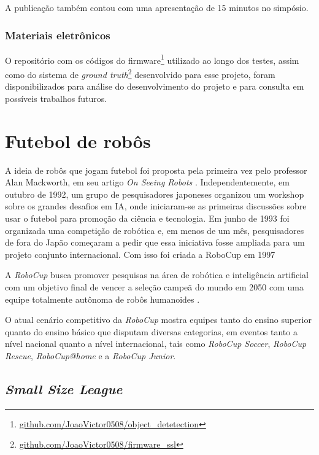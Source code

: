 \documentclass[acronym, symbols, table, deposito]{fei}
\begin{document}
			A publicação também contou com uma apresentação de 15 minutos no simpósio.
			
		\subsection{Materiais eletrônicos}
		
			O repositório com os códigos do firmware\footnote{\href{https://github.com/JoaoVictor0508/object_detetection/tree/main}{github.com/JoaoVictor0508/object\_detetection}} utilizado ao longo dos testes, assim como do sistema de \textit{ground truth}\footnote{\href{https://github.com/JoaoVictor0508/firmware_ssl}{github.com/JoaoVictor0508/firmware\_ssl}} desenvolvido para esse projeto, foram disponibilizados para análise do desenvolvimento do projeto e para consulta em possíveis trabalhos futuros.

	\chapter{Futebol de robôs}\label{sec:chapter_futebol_robos}
	
		A ideia de robôs que jogam futebol foi proposta pela primeira vez pelo professor Alan Mackworth, em seu artigo \textit{On Seeing Robots} \cite{OnSeeingRobots}. Independentemente, em outubro de 1992, um grupo de pesquisadores japoneses organizou um workshop sobre os grandes desafios em IA, onde iniciaram-se as primeiras discussões sobre usar o futebol para promoção da ciência e tecnologia. Em junho de 1993 foi organizada uma competição de robótica e, em menos de um mês, pesquisadores de fora do Japão começaram a pedir que essa iniciativa fosse ampliada para um projeto conjunto internacional. Com isso foi criada a RoboCup em 1997 \cite{RoboCup}
		
		A \textit{RoboCup} busca promover pesquisas na área de robótica e inteligência artificial com um objetivo final de vencer a seleção campeã do mundo em 2050 com uma equipe totalmente autônoma de robôs humanoides \cite{RoboCup}.
		
		O atual cenário competitivo da \textit{RoboCup} mostra equipes tanto do ensino superior quanto do ensino básico que disputam diversas categorias, em eventos tanto a nível nacional quanto a nível internacional, tais como \textit{RoboCup Soccer}, \textit{RoboCup Rescue}, \textit{RoboCup@home} e a \textit{RoboCup Junior}.
	
	\section{\textit{Small Size League}} \label{sec:small_size_league}
	
\end{document}
